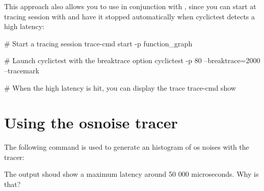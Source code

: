 This approach also allows you to use  in conjunction with ,
since you can start at tracing session with  and have it
stopped automatically when cyclictest detects a high latency:

\begin{bashinput}
	# Start a tracing session
	trace-cmd start -p function_graph

	# Launch cyclictest with the breaktrace option
	cyclictest -p 80 --breaktrace=2000 --tracemark

	# When the high latency is hit, you can display the trace
	trace-cmd show
\end{bashinput}

\section{Using the osnoise tracer}

The following command is used to generate an histogram of os noises with the 
 tracer:


The output shoud show a maximum latency around 50 000 microseconds. Why is that?

